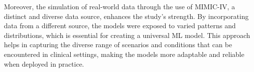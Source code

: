 Moreover, the simulation of real-world data through the use of MIMIC-IV, a distinct and diverse data source, enhances the study's strength.
By incorporating data from a different source, the models were exposed to varied patterns and distributions, which is essential for creating a universal ML model.
This approach helps in capturing the diverse range of scenarios and conditions that can be encountered in clinical settings, making the models more adaptable and reliable when deployed in practice.
